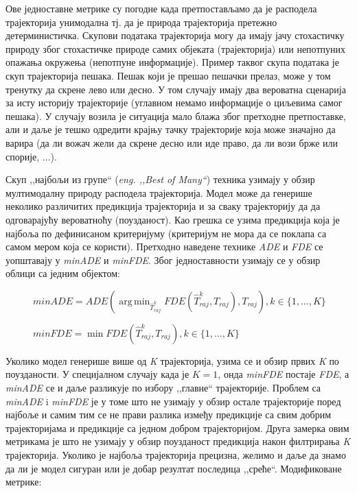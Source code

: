 \documentclass[11pt,oneside]{memoir}
\DeclareMathOperator*{\argmin}{arg\,min}
\begin{document}
Ове једноставне метрике су погодне када претпостављамо да је расподела трајекторија унимодална тј. да је природа трајекторија претежно детерминистичка. 
Скупови података трајекторија могу да имају јачу стохастичку природу због стохастичке природе самих објеката (трајекторија) или непотпуних опажања окружења
(непотпуне информације). 
Пример таквог скупа података је скуп трајекторија пешака. Пешак који је прешао пешачки прелаз, може у том тренутку да скрене лево или десно.
У том случају имају два вероватна сценарија за исту историју трајекторије (углавном немамо информације о циљевима самог пешака). \cite{social_gan} \cite{best_of_many_cvae}
У случају возила је ситуација мало блажа због претходне претпоставке, али и даље је тешко одредити крајњу тачку трајекторије која може значајно да варира 
(да ли вожач жели да скрене десно или иде право, да ли вози брже или спорије, ...). 

Скуп ,,најбољи из групе`` (\textit{eng. ,,Best of Many``}) техника узимају у обзир мултимодалну природу расподела трајекторија. Модел може
да генерише неколико различитих предикција трајекторија и за сваку трајекторију да да одговарајућу вероватноћу (поузданост). Као грешка се узима предикција
која је најбоља по дефинисаном критеријуму (критеријум не мора да се поклапа са самом мером која се користи). \cite{best_of_many_cvae} \cite{argoverse}
Претходно наведене технике \textit{ADE} и \textit{FDE} се уопштавају у \textit{minADE} и \textit{minFDE}. Због једноставности узимају се у обзир облици
са једним објектом: \cite{Disdis} \cite{best_of_many_cvae}

\begin{figure}[H]
  \centering
  $minADE = ADE(\displaystyle\argmin_{\hat{T}^k_{raj}} FDE(\hat{T}^k_{raj}, T_{raj}), T_{raj}), k \in \{1, ..., K\}$ 
\end{figure}

\begin{figure}[H]
  \centering
  $minFDE = \displaystyle\min FDE(\hat{T}^k_{raj}, T_{raj}), k \in \{1, ..., K\}$
\end{figure}

Уколико модел генерише више од \textit{K} трајекторија, узима се и обзир првих \textit{K} по поузданости. У специјалном случају када је $K = 1$, онда 
\textit{minFDE} постаје \textit{FDE}, а \textit{minADE} се и даље разликује по избору ,,главне`` трајекторије. 
Проблем са \textit{minADE} i \textit{minFDE} је у томе што не узимају у обзир остале трајекторије поред најбоље и самим тим се не прави разлика
између предикције са свим добрим трајекторијама и предикције са једном добром трајекторијом. \cite{Disdis} 
Друга замерка овим метрикама је што не узимају у обзир поузданост предикција након филтрирања \textit{K} трајекторија. Уколико је најбоља трајекторија
прецизна, желимо и даље да знамо да ли је модел сигуран или је добар резултат последица ,,среће``. Модификоване метрике: \cite{home}
\end{document}
